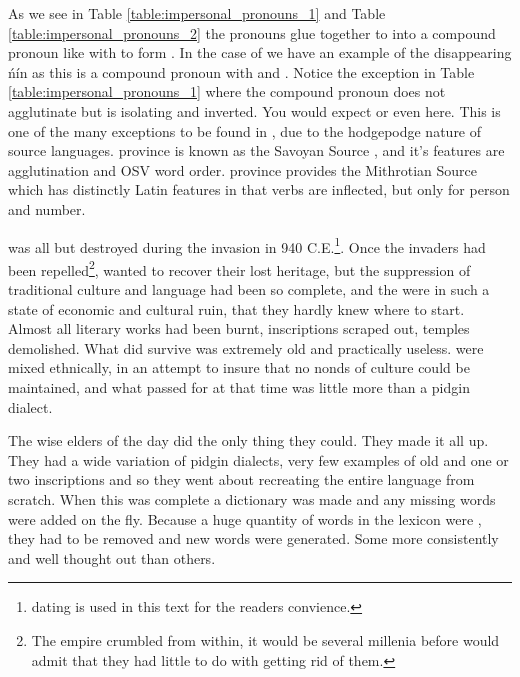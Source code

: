 As we see in Table \ref{table:impersonal_pronouns_1} and Table \ref{table:impersonal_pronouns_2} the pronouns glue together to into a compound pronoun like  with  to form . In the case of  we have an example of the disappearing \'n\' in \klingonl as this is a compound pronoun with  and . Notice the exception in Table \ref{table:impersonal_pronouns_1} where the compound pronoun does not agglutinate but is isolating and inverted. You would expect  or even  here. This is one of the many exceptions to be found in \klingonl, due to the hodgepodge nature of \klingonl source languages.  province is known as the Savoyan Source , and it's features are agglutination and OSV word order.  province provides the Mithrotian Source  which has distinctly Latin features in that verbs are inflected, but only for person and number. 

\klingonl was all but destroyed during the  invasion in 940 C.E.\footnote{\english dating is used in this text for the readers convience.}. Once the invaders had been repelled\footnote{The  empire crumbled from within, it would be several millenia before \klingons would admit that they had little to do with getting rid of them.}, \klingons wanted to recover their lost heritage, but the  suppression of traditional culture and language had been so complete, and the \klingons were in such a state of economic and cultural ruin, that they hardly knew where to start. Almost all literary works had been burnt, inscriptions scraped out, temples demolished. What did survive was extremely old and practically useless. \klingons were mixed ethnically, in an attempt to insure that no nonds of culture could be maintained, and what passed for \klingonl at that time was little more than a pidgin dialect.

The wise elders of the day did the only thing they could. They made it all up. They had a wide variation of pidgin dialects, very few examples of old \klingon and one or two inscriptions and so they went about recreating the entire language from scratch.  When this was complete a dictionary was made and any missing words were added on the fly. Because a huge quantity of words in the lexicon were , they had to be removed and new \klingon words were generated. Some more consistently and well thought out than others.

